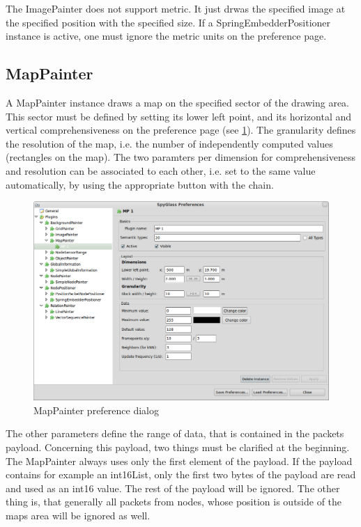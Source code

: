 The ImagePainter does not support metric. It just drwas the specified image at the specified position with the specified
size. If a SpringEmbedderPositioner instance is active, one must ignore the metric units
on the preference page.

\subsection{MapPainter}

A MapPainter instance draws a map on the specified sector of the drawing area. This sector must be defined by
setting its lower left point, and its horizontal and vertical comprehensiveness on the preference page (see
\ref{pic:mp_preferences}). The granularity defines the resolution of the map, i.e. the number of independently
computed values (rectangles on the map). The two paramters per dimension for comprehensiveness and resolution can be associated to
each other, i.e. set to the same value automatically, by using the appropriate button with the chain.

\begin{figure}[htb]
  \begin{center}
    \includegraphics[width=13.2cm]{./pics/mappainter_prefpage}
    \caption{MapPainter preference dialog}
    \label{pic:mp_preferences}
  \end{center}
\end{figure}

The other parameters define the range of data, that is contained in the packets payload. Concerning this
payload, two things must be clarified at the beginning. The MapPainter always uses only the first element of the
payload. If the payload contains for example an int16List, only the first two bytes of the payload are read
and used as an int16 value. The rest of the payload will be ignored. The other thing is, that generally all
packets from nodes, whose position is outside of the maps area will be ignored as well.

